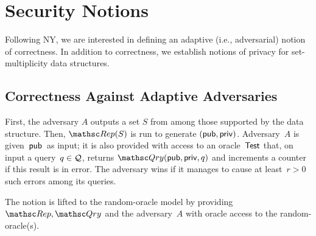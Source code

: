 \section{Security Notions}
\label{sec:security-notions}
Following NY, we are interested in defining an adaptive (i.e.,
adversarial) notion of correctness.
In addition to correctness, we establish notions of privacy for
set-multiplicity data structures.


\subsection{Correctness Against Adaptive Adversaries}

First, the adversary $A$ outputs a set $S$ from among those supported by
the data structure. Then,
$\Rep(S)$ is run to generate $({\sf pub},{\sf priv})$.
Adversary~$A$ is given~${\sf pub}$~as input; it is also
provided with access to an oracle~$\mathsf{Test}$ that, on input a query~$q \in {\cal Q}$,
returns $\Qry(\pubaux,\privaux,q)$ and increments
a counter if this result is in error.  The adversary wins if it
manages to cause at least~$r>0$ such errors among its queries.

The notion is lifted to the random-oracle model by providing
$\Rep,\Qry$ and the adversary~$A$ with oracle access to the
random-oracle(s).

